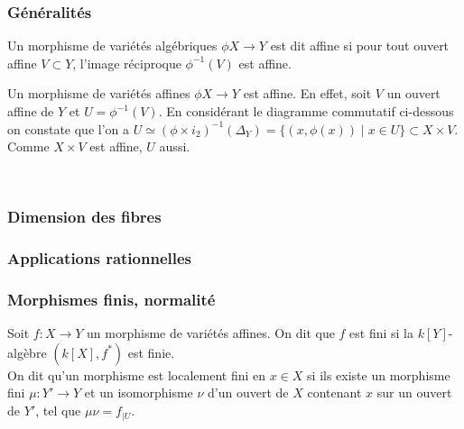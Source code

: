 \subsubsection{Généralités}

\begin{defn}
Un morphisme de variétés algébriques $\phi X\rightarrow Y$ est dit affine si pour tout ouvert affine $V\subset Y$, l'image réciproque $\phi^{-1}(V)$ est affine.
\end{defn}

\begin{ex}\label{exaff}
Un morphisme de variétés affines $\phi X\rightarrow Y$ est affine. En effet, soit $V$ un ouvert affine de $Y$ et $U=\phi^{-1}(V)$. En considérant le diagramme commutatif ci-dessous on constate que l'on a $U \simeq (\phi\times i_2)^{-1}(\Delta_Y)=\lbrace (x,\phi(x))\mid x\in U \rbrace \subset X\times V$. Comme $X\times V$ est affine, $U$ aussi.
	\begin{center}
	\\
	\end{center}

\end{ex}

\subsubsection{Dimension des fibres}

\subsubsection{Applications rationnelles}

\subsubsection{Morphismes finis, normalité}

\begin{defn}
Soit $f:X \rightarrow Y$ un morphisme de variétés affines. On dit que $f$ est fini si la $k[Y]$-algèbre $(k[X], f^*)$ est finie.\\
On dit qu'un morphisme est localement fini en $x\in X$ si ils existe un morphisme fini $\mu:Y' \rightarrow Y$ et un isomorphisme $\nu$ d'un ouvert de $X$ contenant $x$ sur un ouvert de $Y'$, tel que $\mu\nu =f_{|U}$.
\end{defn}


